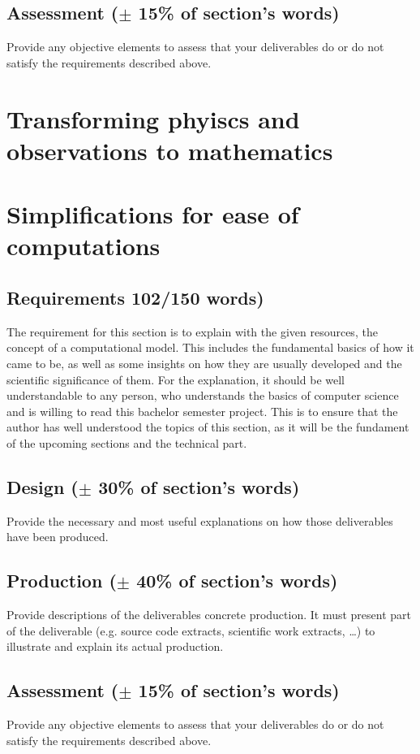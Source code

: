 \documentclass[conference,compsoc]{IEEEtran}
\begin{document}
\subsection{Assessment ($\pm$ 15\% of section's words)}
Provide any objective elements to assess that your deliverables do or do not satisfy the requirements described above. 

\section{Transforming phyiscs and observations to mathematics}
\section{Simplifications for ease of computations}
\label{sec-computational-model}
\subsection{Requirements 102/150 words)}
The requirement for this section is to explain with the given resources, the concept of a computational model. This includes the fundamental basics of how it came to be, as well as some insights on how they are usually developed and the scientific significance of them. For the explanation, it should be well understandable to any person, who understands the basics of computer science and is willing to read this bachelor semester project. This is to ensure that the author has well understood the topics of this section, as it will be the fundament of the upcoming sections and the technical part.
\subsection{Design ($\pm$ 30\% of section's words)}
Provide the necessary and most useful explanations on how those deliverables have been produced.
\subsection{Production ($\pm$ 40\% of section's words)}
Provide descriptions of the deliverables concrete production. It must present part of the deliverable (e.g. source code extracts, scientific work extracts, \ldots) to illustrate and explain its actual production.
\subsection{Assessment ($\pm$ 15\% of section's words)}
Provide any objective elements to assess that your deliverables do or do not satisfy the requirements described above. 
\end{document}
